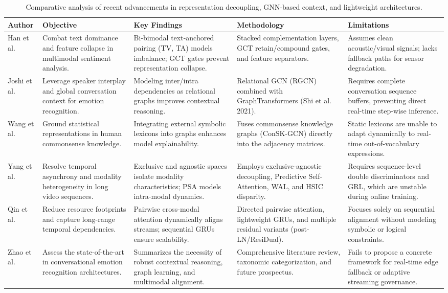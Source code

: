\documentclass[sn-mathphys,Numbered]{sn-jnl}
\theoremstyle{thmstyleone}
\theoremstyle{thmstyletwo}
\theoremstyle{thmstylethree}
\begin{document}
\begin{table}[t]
\centering
\caption{Comparative analysis of recent advancements in representation decoupling, GNN-based context, and lightweight architectures.}
\label{tab:lit_review_2}
\setlength{\tabcolsep}{4pt}
\renewcommand{\arraystretch}{1.3}
\scriptsize
\begin{tabular}{p{2.3cm} p{2.8cm} p{3.2cm} p{3.2cm} p{3.0cm}}
\toprule
\textbf{Author} & \textbf{Objective} & \textbf{Key Findings} & \textbf{Methodology} & \textbf{Limitations} \\
\midrule
Han et al. \cite{han2021bibimodal} & Combat text dominance and feature collapse in multimodal sentiment analysis. & Bi-bimodal text-anchored pairing (TV, TA) models imbalance; GCT gates prevent representation collapse. & Stacked complementation layers, GCT retain/compound gates, and feature separators. & Assumes clean acoustic/visual signals; lacks fallback paths for sensor degradation. \\
\midrule
Joshi et al. \cite{joshi2022cogmen} & Leverage speaker interplay and global conversation context for emotion recognition. & Modeling inter/intra dependencies as relational graphs improves contextual reasoning. & Relational GCN (RGCN) combined with GraphTransformers (Shi et al. 2021). & Requires complete conversation sequence buffers, preventing direct real-time step-wise inference. \\
\midrule
Wang et al. \cite{wang2022context} & Ground statistical representations in human commonsense knowledge. & Integrating external symbolic lexicons into graphs enhances model explainability. & Fuses commonsense knowledge graphs (ConSK-GCN) directly into the adjacency matrices. & Static lexicons are unable to adapt dynamically to real-time out-of-vocabulary expressions. \\
\midrule
Yang et al. \cite{yang2024asynchronous} & Resolve temporal asynchrony and modality heterogeneity in long video sequences. & Exclusive and agnostic spaces isolate modality characteristics; PSA models intra-modal dynamics. & Employs exclusive-agnostic decoupling, Predictive Self-Attention, WAL, and HSIC disparity. & Requires sequence-level double discriminators and GRL, which are unstable during online training. \\
\midrule
Qin et al. \cite{qin2025multimodal} & Reduce resource footprints and capture long-range temporal dependencies. & Pairwise cross-modal attention dynamically aligns streams; sequential GRUs ensure scalability. & Directed pairwise attention, lightweight GRUs, and multiple residual variants (post-LN/ResiDual). & Focuses solely on sequential alignment without modeling symbolic or logical constraints. \\
\midrule
Zhao et al. \cite{zhao2025merc} & Assess the state-of-the-art in conversational emotion recognition architectures. & Summarizes the necessity of robust contextual reasoning, graph learning, and multimodal alignment. & Comprehensive literature review, taxonomic categorization, and future prospectus. & Fails to propose a concrete framework for real-time edge fallback or adaptive streaming governance. \\
\bottomrule
\end{tabular}
\end{table}
\end{document}
